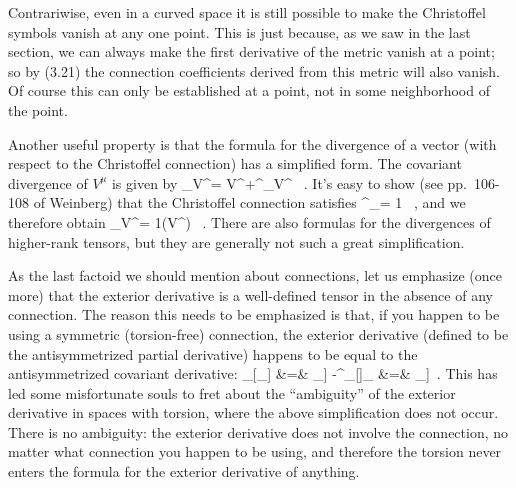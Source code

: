 \documentclass[12pt]{article}
\begin{document}
Contrariwise, even in a curved space it is still possible to make
the Christoffel symbols vanish at any one point.  This is just
because, as we saw in the last section, we can always make the first 
derivative of the metric vanish at a point; so by (3.21) the connection
coefficients derived from this metric will also vanish.  Of course
this can only be established at a point, not in some neighborhood
of the point.

Another useful property is that the formula for the divergence
of a vector (with respect to the Christoffel connection) has a
simplified form.  The covariant divergence of $V^\mu$ is given by
\be
  \nabla_\mu V^\mu = \p\mu V^\mu +\Gamma^\mu_{\mu\lambda}V^\lambda
  \ .\label{3.26}
\ee
It's easy to show (see pp.~106-108 of Weinberg) that the Christoffel
connection satisfies
\be
  \Gamma^\mu_{\mu\lambda}= {1}\p\lambda
  \ ,\label{3.27}
\ee
and we therefore obtain
\be
  \nabla_\mu V^\mu = {1}\p\mu(V^\mu)
  \ .\label{3.28}
\ee
There are also formulas for the divergences of higher-rank tensors,
but they are generally not such a great simplification.

As the last factoid we should mention about connections, let us 
emphasize (once more) that the exterior derivative is a well-defined
tensor in the absence of any connection.  The reason this needs to
be emphasized is that, if you happen to be using a symmetric 
(torsion-free) connection, the exterior derivative (defined to be the
antisymmetrized partial derivative) happens to be equal to the
antisymmetrized covariant derivative:
\bea
  \nabla_{[\mu}\omega_{\nu]} &=& \p{[\mu}\omega_{\nu]}
  -\Gamma^\lambda_{[\mn]}\omega_\lambda \cr
  &=& \p{[\mu}\omega_{\nu]}\ . \label{3.29}
\eea
This has led some misfortunate souls to fret about the ``ambiguity''
of the exterior derivative in spaces with torsion, where the above
simplification does not occur.  There is no ambiguity: the exterior
derivative does not involve the connection, no matter what connection
you happen to be using, and therefore the torsion never enters the
formula for the exterior derivative of anything.
\end{document}
